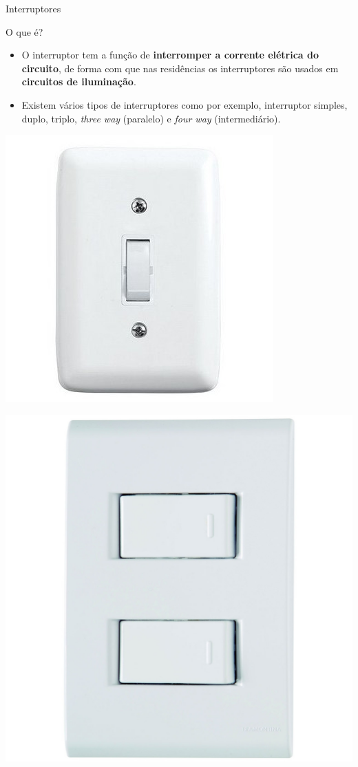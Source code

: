 \begin{frame}{Interruptores}
	\begin{block}{O que é?}
		\begin{itemize}
			\item O interruptor tem a função de \textbf{interromper a corrente elétrica do circuito}, de forma com que nas residências os interruptores são usados em \textbf{circuitos de iluminação}.
			\item Existem vários tipos de interruptores como por exemplo, interruptor simples, duplo, triplo, \textit{three way} (paralelo) e \textit{four way} (intermediário).
		\end{itemize}
	\end{block}

	\begin{minipage}{0.3\linewidth}
		\centering
		\includegraphics[height=0.5\textheight]{Figuras/Ch08/fig1}
	\end{minipage}\hfill
	\begin{minipage}{0.3\linewidth}
		\centering
		\includegraphics[height=0.45\textheight]{Figuras/Ch08/fig2}

\end{minipage}
\end{frame}
